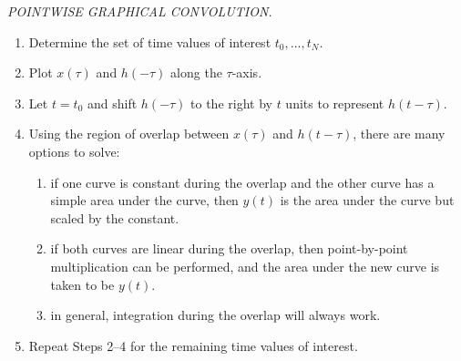 \documentclass{report}
\begin{document}
\begin{tcolorbox}[width=\textwidth,colback={white}, sharp corners]
    \noindent\emph{POINTWISE GRAPHICAL CONVOLUTION.}
    \begin{enumerate}[Step 1:]
        \item Determine the set of time values of interest $t_0, ..., t_N$.
        \item Plot $x(\tau)$ and $h(-\tau)$ along the $\tau$-axis.
        \item Let $t=t_0$ and shift $h(-\tau)$ to the right by $t$ units to represent $h(t-\tau)$.
        \item Using the region of overlap between $x(\tau)$ and $h(t-\tau)$, there are many options to solve:
        \begin{enumerate}
            \item if one curve is constant during the overlap and the other curve has a simple area under the curve, then $y(t)$ is the area under the curve but scaled by the constant.
            \item if both curves are linear during the overlap, then point-by-point multiplication can be performed, and the area under the new curve is taken to be $y(t)$.
            \item in general, integration during the overlap will always work.
        \end{enumerate}
        \item Repeat Steps 2--4 for the remaining time values of interest.
    \end{enumerate}
\end{tcolorbox}
\end{document}
